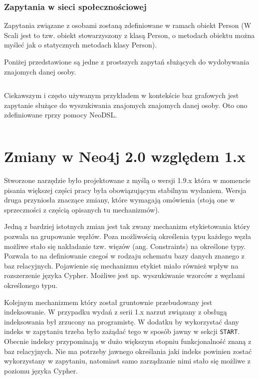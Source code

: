 \documentclass[brudnopis]{xmgr}
\begin{document}
\inputminted{scala}{listings/scala/examples/socialnetwork/domain-classes.scala}

\subsection{Zapytania w sieci społecznościowej}

Zapytania związane z osobami zostaną zdefiniowane w ramach obiekt Person (W Scali jest to tzw. obiekt stowarzyszony z klasą Person, o metodach obiektu można myśleć jak o statycznych metodach klasy Person).

Poniżej przedstawione są jedne z prostszych zapytań służących do wydobywania znajomych danej osoby.

\inputminted{scala}{listings/scala/examples/socialnetwork/person-friends-query.scala}

Ciekawszym i często używanym przykładem w kontekście baz grafowych jest zapytanie służące do wyszukiwania znajomych znajomych danej osoby. Oto ono zdefiniowane rprzy pomocy NeoDSL.

\inputminted{scala}{listings/scala/examples/socialnetwork/person-fof-query.scala}

\chapter{Zmiany w Neo4j 2.0 względem 1.x}

Stworzone narzędzie było projektowane z myślą o wersji 1.9.x która w momencie pisania większej części pracy była obowiązującym stabilnym wydaniem. Wersja druga przyniosła znaczące zmiany, które wymagają omówienia (stoją one w sprzeczności z częścią opisanych tu mechanizmów).

Jedną z bardziej istotnych zmian jest tak zwany mechanizm etykietowania który pozwala na grupowanie węzłów. Poza możliwością określenia typu każdego węzła możliwe stało się nakładanie tzw. więzów (ang. Constraints) na określone typy. Pozwala to na definiowanie czegoś w rodzaju schematu bazy danych znanego z baz relacyjnych. Pojawienie się mechanizmu etykiet miało również wpływ na rozszerzenie języka Cypher. Możliwe jest np. wyszukiwanie wzorców z węzłami określonego typu.

Kolejnym mechanizmem który został gruntownie przebudowany jest indeksowanie. W przypadku wydań z serii 1.x narzut związany z obsługą indeksowania był zrzucony na programistę. W dodatku by wykorzystać dany indeks w zapytaniu trzeba było zażądać tego w sposób jawny w sekcji \texttt{START}. Obecnie indeksy przypominają w dużo większym stopniu funkcjonalność znaną z baz relacyjnych. Nie ma potrzeby jawnego określania jaki indeks powinien zostać wykorzystany w zapytaniu, natomiast samo zarządzanie nimi stało się możliwe z poziomu języka Cypher.
\end{document}
